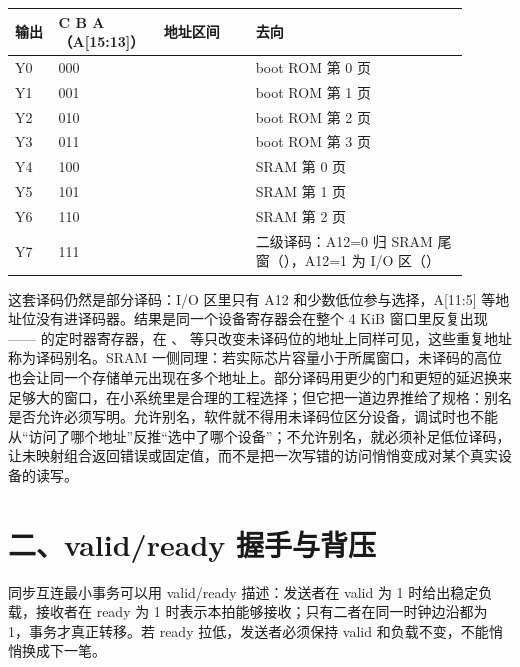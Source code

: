 
\begin{longtable}{L{0.09\linewidth}L{0.18\linewidth}L{0.19\linewidth}L{0.44\linewidth}}
\toprule
输出 & C B A（A[15:13]） & 地址区间 & 去向 \\
\midrule
Y0 & 000 &  & boot ROM 第 0 页 \\\tablerowrule
Y1 & 001 &  & boot ROM 第 1 页 \\\tablerowrule
Y2 & 010 &  & boot ROM 第 2 页 \\\tablerowrule
Y3 & 011 &  & boot ROM 第 3 页 \\\tablerowrule
Y4 & 100 &  & SRAM 第 0 页 \\\tablerowrule
Y5 & 101 &  & SRAM 第 1 页 \\\tablerowrule
Y6 & 110 &  & SRAM 第 2 页 \\\tablerowrule
Y7 & 111 &  & 二级译码：A12=0 归 SRAM 尾窗（），A12=1 为 I/O 区（） \\
\bottomrule
\end{longtable}

这套译码仍然是部分译码：I/O 区里只有 A12 和少数低位参与选择，A[11:5] 等地址位没有进译码器。结果是同一个设备寄存器会在整个 4 KiB 窗口里反复出现—— 的定时器寄存器，在 、 等只改变未译码位的地址上同样可见，这些重复地址称为译码别名。SRAM 一侧同理：若实际芯片容量小于所属窗口，未译码的高位也会让同一个存储单元出现在多个地址上。部分译码用更少的门和更短的延迟换来足够大的窗口，在小系统里是合理的工程选择；但它把一道边界推给了规格：别名是否允许必须写明。允许别名，软件就不得用未译码位区分设备，调试时也不能从“访问了哪个地址”反推“选中了哪个设备”；不允许别名，就必须补足低位译码，让未映射组合返回错误或固定值，而不是把一次写错的访问悄悄变成对某个真实设备的读写。

\section{二、valid/ready 握手与背压}

同步互连最小事务可以用 valid/ready 描述：发送者在 valid 为 1 时给出稳定负载，接收者在 ready 为 1 时表示本拍能够接收；只有二者在同一时钟边沿都为 1，事务才真正转移。若 ready 拉低，发送者必须保持 valid 和负载不变，不能悄悄换成下一笔。

